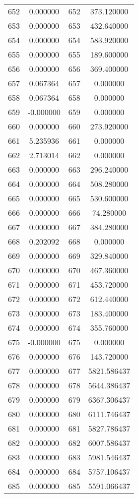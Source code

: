 \documentclass[12pt]{article}
\begin{document}
\begin{longtable}{@{}cccc@{}}
652 & 0.000000 & 652 & 373.120000 \\
653 & 0.000000 & 653 & 432.640000 \\
654 & 0.000000 & 654 & 583.920000 \\
655 & 0.000000 & 655 & 189.600000 \\
656 & 0.000000 & 656 & 369.400000 \\
657 & 0.067364 & 657 & 0.000000 \\
658 & 0.067364 & 658 & 0.000000 \\
659 & -0.000000 & 659 & 0.000000 \\
660 & 0.000000 & 660 & 273.920000 \\
661 & 5.235936 & 661 & 0.000000 \\
662 & 2.713014 & 662 & 0.000000 \\
663 & 0.000000 & 663 & 296.240000 \\
664 & 0.000000 & 664 & 508.280000 \\
665 & 0.000000 & 665 & 530.600000 \\
666 & 0.000000 & 666 & 74.280000 \\
667 & 0.000000 & 667 & 384.280000 \\
668 & 0.202092 & 668 & 0.000000 \\
669 & 0.000000 & 669 & 329.840000 \\
670 & 0.000000 & 670 & 467.360000 \\
671 & 0.000000 & 671 & 453.720000 \\
672 & 0.000000 & 672 & 612.440000 \\
673 & 0.000000 & 673 & 183.400000 \\
674 & 0.000000 & 674 & 355.760000 \\
675 & -0.000000 & 675 & 0.000000 \\
676 & 0.000000 & 676 & 143.720000 \\
677 & 0.000000 & 677 & 5821.586437 \\
678 & 0.000000 & 678 & 5644.386437 \\
679 & 0.000000 & 679 & 6367.306437 \\
680 & 0.000000 & 680 & 6111.746437 \\
681 & 0.000000 & 681 & 5827.786437 \\
682 & 0.000000 & 682 & 6007.586437 \\
683 & 0.000000 & 683 & 5981.546437 \\
684 & 0.000000 & 684 & 5757.106437 \\
685 & 0.000000 & 685 & 5591.066437 \\

\end{longtable}
\end{document}
